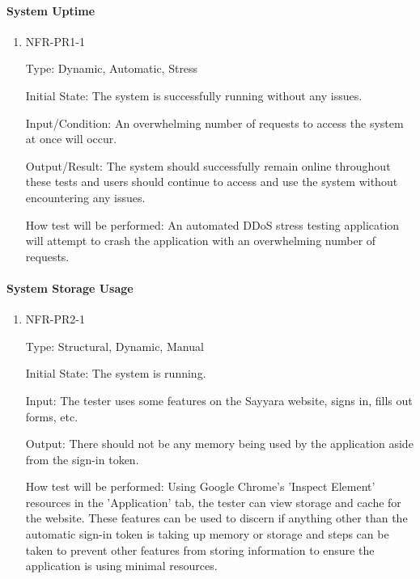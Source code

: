 \documentclass[12pt, titlepage]{article}
\begin{document}
\paragraph{System Uptime}

\begin{enumerate}

\item{NFR-PR1-1\\}

Type: Dynamic, Automatic, Stress
					
Initial State: The system is successfully running without any issues.
					
Input/Condition: An overwhelming number of requests to access the system at once will occur.
					
Output/Result: The system should successfully remain online throughout these tests and users should continue to access and use the system without encountering any issues.
					
How test will be performed: An automated DDoS stress testing application will attempt to crash the application with an overwhelming number of requests.

\end{enumerate}

\paragraph{System Storage Usage}

\begin{enumerate}

\item{NFR-PR2-1\\}

Type: Structural, Dynamic, Manual
					
Initial State: The system is running.
					
Input: The tester uses some features on the Sayyara website, signs in, fills out forms, etc.
					
Output: There should not be any memory being used by the application aside from the sign-in token.
					
How test will be performed: Using Google Chrome's 'Inspect Element' resources in the 'Application' tab, the tester can view storage and cache for the website. These features can be used to discern if anything other than the automatic sign-in token is taking up memory or storage and steps can be taken to prevent other features from storing information to ensure the application is using minimal resources.

\end{enumerate}
\end{document}
